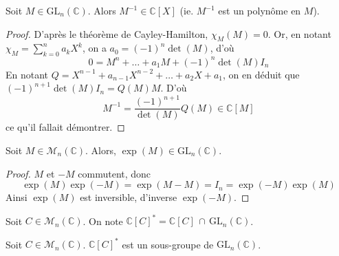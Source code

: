 






  \begin{lemma}
    \label{surjectivite-de-l-exponentielle-1}
    Soit $M \in \mathrm{GL}_n(\mathbb{C})$. Alors $M^{-1} \in \mathbb{C}[X]$ (ie. $M^{-1}$ est un polynôme en $M$).
  \end{lemma}

  \begin{proof}
    D'après le théorème de Cayley-Hamilton, $\chi_M(M) = 0$. Or, en notant $\chi_M = \sum_{k=0}^n a_k X^k$, on a $a_0 = (-1)^n \det(M)$, d'où
    \[ 0 = M^n + \dots + a_1 M + (-1)^n \det(M) I_n \]
    En notant $Q = X^{n-1} + a_{n-1}X^{n-2} + \dots + a_2 X + a_1$, on en déduit que $(-1)^{n+1} \det(M) I_n = Q(M)M$. D'où
    \[ M^{-1} = \frac{(-1)^{n+1}}{\det(M)} Q(M) \in \mathbb{C}[M] \]
    ce qu'il fallait démontrer.
  \end{proof}

  \begin{lemma}
    \label{surjectivite-de-l-exponentielle-2}
    Soit $M \in \mathcal{M}_n(\mathbb{C})$. Alors, $\exp(M) \in \mathrm{GL}_n(\mathbb{C})$.
  \end{lemma}

  \begin{proof}
    $M$ et $-M$ commutent, donc
    \[ \exp(M)\exp(-M) = \exp(M-M) = I_n = \exp(-M)\exp(M) \]
    Ainsi $\exp(M)$ est inversible, d'inverse $\exp(-M)$.
  \end{proof}
  
    \begin{notation}
    Soit $C \in \mathcal{M}_n(\mathbb{C})$. On note $\mathbb{C}[C]^* = \mathbb{C}[C] \, \cap \, \mathrm{GL}_n(\mathbb{C})$.
  \end{notation}
  
  \begin{lemma}
    \label{surjectivite-de-l-exponentielle-3}
    Soit $C \in \mathcal{M}_n(\mathbb{C})$. $\mathbb{C}[C]^*$ est un sous-groupe de $\mathrm{GL}_n(\mathbb{C})$.
  \end{lemma}
  
